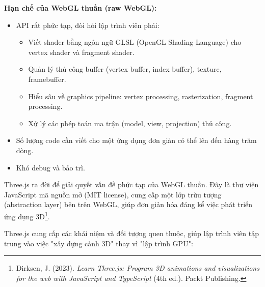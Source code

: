\textbf{Hạn chế của WebGL thuần (raw WebGL):}
\begin{itemize}
    \item API rất phức tạp, đòi hỏi lập trình viên phải:
    \begin{itemize}
        \item Viết shader bằng ngôn ngữ GLSL (OpenGL Shading Language) cho vertex shader và fragment shader.
        \item Quản lý thủ công buffer (vertex buffer, index buffer), texture, framebuffer.
        \item Hiểu sâu về graphics pipeline: vertex processing, rasterization, fragment processing.
        \item Xử lý các phép toán ma trận (model, view, projection) thủ công.
    \end{itemize}
    \item Số lượng code cần viết cho một ứng dụng đơn giản có thể lên đến hàng trăm dòng.
    \item Khó debug và bảo trì.
\end{itemize}

Three.js ra đời để giải quyết vấn đề phức tạp của WebGL thuần. Đây là thư viện JavaScript mã nguồn mở (MIT license), cung cấp một lớp trừu tượng (abstraction layer) bên trên WebGL, giúp đơn giản hóa đáng kể việc phát triển ứng dụng 3D\footnote{Dirksen, J. (2023). \textit{Learn Three.js: Program 3D animations and visualizations for the web with JavaScript and TypeScript} (4th ed.). Packt Publishing.}.

Three.js cung cấp các khái niệm và đối tượng quen thuộc, giúp lập trình viên tập trung vào việc "xây dựng cảnh 3D" thay vì "lập trình GPU":

